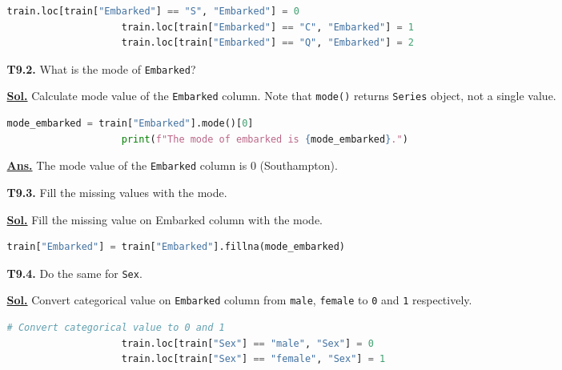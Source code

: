 \documentclass[12pt, a4paper]{article}
\newcommand{\sol}{\par\noindent\underline{\textbf{Sol.}} }
\newcommand{\ans}{\par\noindent\underline{\textbf{Ans.}} }
\begin{document}
\begin{enumerate}
\begin{itemize}
                \begin{lstlisting}[language=Python, caption=Convert categorical value on \texttt{Embarked} column, gobble=20]
                    train.loc[train["Embarked"] == "S", "Embarked"] = 0
                    train.loc[train["Embarked"] == "C", "Embarked"] = 1
                    train.loc[train["Embarked"] == "Q", "Embarked"] = 2
                \end{lstlisting}

                \item[\textbf{T9.2.}] What is the mode of \texttt{Embarked}?

                \sol Calculate mode value of the \texttt{Embarked} column. Note that \texttt{mode()} returns \texttt{Series} object, not a single value.

                \begin{lstlisting}[language=Python, caption=Calculate mode value of the \texttt{Embarked} column, gobble=20]
                    mode_embarked = train["Embarked"].mode()[0]
                    print(f"The mode of embarked is {mode_embarked}.")
                \end{lstlisting}

                \ans The mode value of the \texttt{Embarked} column is 0 (Southampton).

                \vspace{1em}

                \item[\textbf{T9.3.}] Fill the missing values with the mode.

                \sol Fill the missing value on Embarked column with the mode.

                \begin{lstlisting}[language=Python, caption=Fill the missing embarked value with mode value, gobble=20]
                    train["Embarked"] = train["Embarked"].fillna(mode_embarked)
                \end{lstlisting}

                \item[\textbf{T9.4.}] Do the same for \texttt{Sex}.

                \sol Convert categorical value on \texttt{Embarked} column from \texttt{male}, \texttt{female} to \texttt{0} and \texttt{1} respectively.

                \begin{lstlisting}[language=Python, caption=Repeat the process on the \texttt{Sex} column., gobble=20]
                    # Convert categorical value to 0 and 1
                    train.loc[train["Sex"] == "male", "Sex"] = 0
                    train.loc[train["Sex"] == "female", "Sex"] = 1


\end{lstlisting}
\end{itemize}
\end{enumerate}
\end{document}
